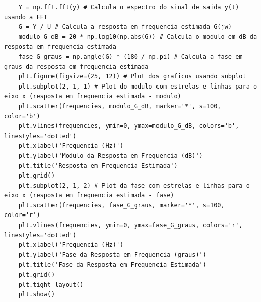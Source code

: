 \documentclass[10pt]{article}
\begin{document}
\small
\begin{verbatim}
    Y = np.fft.fft(y) # Calcula o espectro do sinal de saida y(t) usando a FFT
    G = Y / U # Calcula a resposta em frequencia estimada G(jw)
    modulo_G_dB = 20 * np.log10(np.abs(G)) # Calcula o modulo em dB da resposta em frequencia estimada
    fase_G_graus = np.angle(G) * (180 / np.pi) # Calcula a fase em graus da resposta em frequencia estimada
    plt.figure(figsize=(25, 12)) # Plot dos graficos usando subplot
    plt.subplot(2, 1, 1) # Plot do modulo com estrelas e linhas para o eixo x (resposta em frequencia estimada - modulo)
    plt.scatter(frequencies, modulo_G_dB, marker='*', s=100, color='b')
    plt.vlines(frequencies, ymin=0, ymax=modulo_G_dB, colors='b', linestyles='dotted')
    plt.xlabel('Frequencia (Hz)')
    plt.ylabel('Modulo da Resposta em Frequencia (dB)')
    plt.title('Resposta em Frequencia Estimada')
    plt.grid()
    plt.subplot(2, 1, 2) # Plot da fase com estrelas e linhas para o eixo x (resposta em frequencia estimada - fase)
    plt.scatter(frequencies, fase_G_graus, marker='*', s=100, color='r')
    plt.vlines(frequencies, ymin=0, ymax=fase_G_graus, colors='r', linestyles='dotted')
    plt.xlabel('Frequencia (Hz)')
    plt.ylabel('Fase da Resposta em Frequencia (graus)')
    plt.title('Fase da Resposta em Frequencia Estimada')
    plt.grid()
    plt.tight_layout()
    plt.show()
\end{verbatim}
\end{document}
